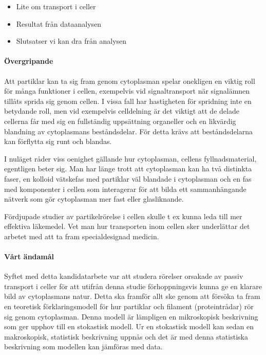 \begin{itemize}
    \item Lite om transport i celler
    \item Resultat från dataanalysen
    \item Slutsatser vi kan dra från analysen
\end{itemize}



\paragraph{Övergripande}
Att partiklar kan ta sig fram genom cytoplasman spelar onekligen en viktig roll för många funktioner i cellen, exempelvis vid signaltransport när signalämnen tillåts sprida sig genom cellen. I vissa fall har hastigheten för spridning inte en betydande roll, men vid exempelvis celldelning är det viktigt att de delade cellerna får med sig en fullständig uppsättning organeller och en likvärdig blandning av cytoplasmans beståndsdelar. För detta krävs att beståndsdelarna kan förflytta sig runt och blandas.

I nuläget råder viss oenighet gällande hur cytoplasman, cellens fyllnadsmaterial, egentligen beter sig. Man har länge trott att cytoplasman kan ha två distinkta faser, en kolloid vätskefas med partiklar väl blandade i cytoplasman och en fas med komponenter i cellen som interagerar för att bilda ett sammanhängande nätverk som gör cytoplasman mer fast eller glasliknande.

Fördjupade studier av partikelrörelse i cellen skulle t ex kunna leda till mer effektiva läkemedel. Vet man hur transporten inom cellen sker underlättar det arbetet med att ta fram specialdesignad medicin.


\paragraph{Vårt ändamål}
Syftet med detta kandidatarbete var att studera rörelser orsakade av passiv transport i celler för att utifrån denna studie förhoppningsvis kunna ge en klarare bild av cytoplasmans natur. Detta ska framför allt ske genom att försöka ta fram en teoretisk förklaringsmodell för hur partiklar och filament (proteintrådar) rör sig genom cytoplasman. 
Denna modell är lämpligen en mikroskopisk beskrivning som ger upphov till en stokastisk modell. Ur en stokastisk modell kan sedan en makroskopisk, statistisk beskrivning uppnås och det är med denna statistiska beskrivning som modellen kan jämföras med data. 

